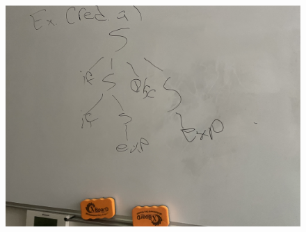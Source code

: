 \documentclass[12pt]{article}
\begin{document}
\begin{enumerate}
\begin{figure}
    \end{figure}
    \begin{figure}
        \centering
                \includegraphics[totalheight=8cm]{ExCr-a}
    \end{figure}
    

\end{enumerate}
\end{document}
